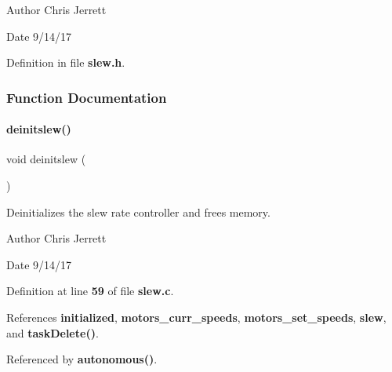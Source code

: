 \begin{DoxyAuthor}{Author}
Chris Jerrett 
\end{DoxyAuthor}
\begin{DoxyDate}{Date}
9/14/17 
\end{DoxyDate}


Definition in file \textbf{ slew.\+h}.



\subsubsection{Function Documentation}
\mbox{\label{slew_8h_a981c9990a969d2587e66e550737f7cd9}} 
\paragraph{deinitslew()}
{\footnotesize\ttfamily void deinitslew (\begin{DoxyParamCaption}{ }\end{DoxyParamCaption})}



Deinitializes the slew rate controller and frees memory. 

\begin{DoxyAuthor}{Author}
Chris Jerrett 
\end{DoxyAuthor}
\begin{DoxyDate}{Date}
9/14/17 
\end{DoxyDate}


Definition at line \textbf{ 59} of file \textbf{ slew.\+c}.



References \textbf{ initialized}, \textbf{ motors\+\_\+curr\+\_\+speeds}, \textbf{ motors\+\_\+set\+\_\+speeds}, \textbf{ slew}, and \textbf{ task\+Delete()}.



Referenced by \textbf{ autonomous()}.


